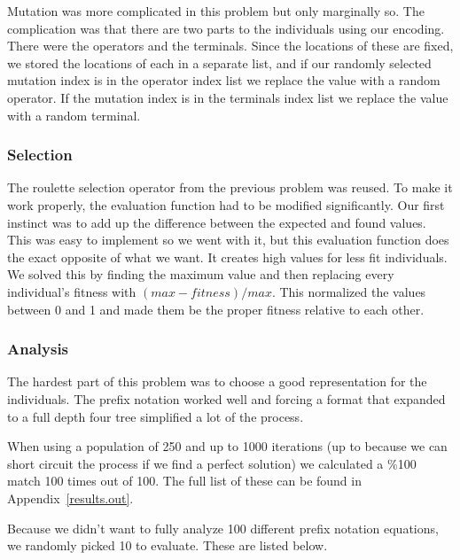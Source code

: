 Mutation was more complicated in this problem but only marginally so. The complication was that there are two parts to the individuals using our encoding. There were the operators and the terminals. Since the locations of these are fixed, we stored the locations of each in a separate list, and if our randomly selected mutation index is in the operator index list we replace the value with a random operator. If the mutation index is in the terminals index list we replace the value with a random terminal.

\subsubsection{Selection}
The roulette selection operator from the previous problem was reused. To make it work properly, the evaluation function had to be modified significantly. Our first instinct was to add up the difference between the expected and found values. This was easy to implement so we went with it, but this evaluation function does the exact opposite of what we want. It creates high values for less fit individuals. We solved this by finding the maximum value and then replacing every individual's fitness with $(max - fitness) / max$. This normalized the values between 0 and 1 and made them be the proper fitness relative to each other.

\subsubsection{Analysis}
The hardest part of this problem was to choose a good representation for the individuals. The prefix notation worked well and forcing a format that expanded to a full depth four tree simplified a lot of the process.

When using a population of 250 and up to 1000 iterations (up to because we can short circuit the process if we find a perfect solution) we calculated a \%100 match 100 times out of 100. The full list of these can be found in Appendix~\ref{results.out}.

Because we didn't want to fully analyze 100 different prefix notation equations, we randomly picked 10 to evaluate. These are listed below.


